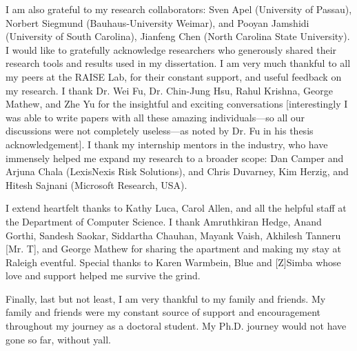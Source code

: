 I am also grateful to my research collaborators: Sven Apel (University of Passau), Norbert Siegmund (Bauhaus-University Weimar), and Pooyan Jamshidi (University of South Carolina), Jianfeng Chen (North Carolina State University).  I would like to gratefully acknowledge researchers who generously shared their research tools and results used in my dissertation.  I am very much
thankful to all my peers at the RAISE Lab, for their constant support, and useful feedback on
my research. I thank Dr. Wei Fu, Dr. Chin-Jung Hsu, Rahul Krishna, George Mathew, and Zhe Yu for the insightful and exciting conversations [interestingly I was able to write papers with all these amazing individuals---so all our discussions were not completely useless---as noted by Dr. Fu in his thesis acknowledgement]. 
I thank my internship mentors in the industry, who have immensely helped me expand
my research to a broader scope: Dan Camper and Arjuna Chala (LexisNexis Risk Solutions), and Chris Duvarney, Kim Herzig, and Hitesh Sajnani (Microsoft Research, USA). 


I extend heartfelt thanks to Kathy Luca, Carol Allen, and all the helpful staff at the Department
of Computer Science. I thank Amruthkiran Hedge, Anand Gorthi, Sandesh Saokar, Siddartha Chauhan, Mayank Vaish, Akhilesh Tanneru [Mr. T], and George Mathew for
sharing the apartment and making my stay at Raleigh eventful. Special thanks to Karen Warmbein, Blue and [Z]Simba whose love and support helped me survive the grind.



Finally, last but not least, I am very thankful to my family and friends. My family and friends were my constant source of support and encouragement throughout my journey as a doctoral student. 
My Ph.D. journey would not have gone so far, without y\textquotesingle all.